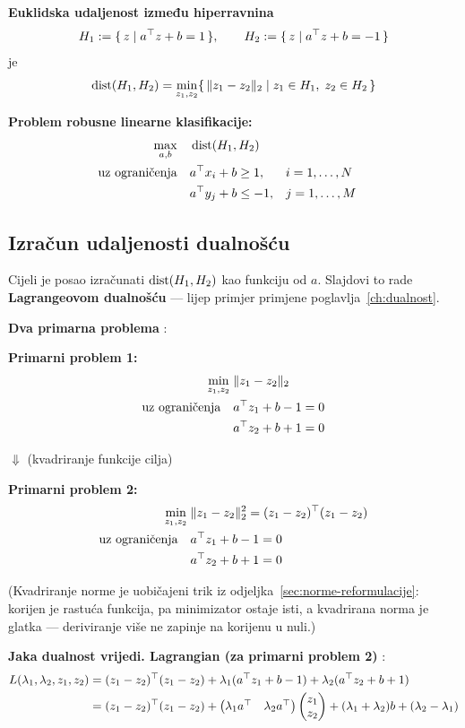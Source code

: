 \textbf{Euklidska udaljenost između hiperravnina}
\[
H_1 := \{\, z \mid a\T z + b = 1 \,\}, \qquad
H_2 := \{\, z \mid a\T z + b = -1 \,\}
\]
je
\[
\dist(H_1, H_2) = \min_{z_1,z_2}\{\, \|z_1 - z_2\|_2 \mid
z_1 \in H_1,\; z_2 \in H_2 \,\}
\]

\textbf{Problem robusne linearne klasifikacije:}
\begin{equation}
\label{eq:robusna-klasifikacija}
\begin{aligned}
\max_{a,b} \quad & \dist(H_1, H_2) \\
\uzogr & a\T x_i + b \ge 1, && i = 1,\dots,N \\
       & a\T y_j + b \le -1, && j = 1,\dots,M
\end{aligned}
\end{equation}

\subsection{Izračun udaljenosti dualnošću}

Cijeli je posao izračunati $\dist(H_1,H_2)$ kao funkciju od $a$. Slajdovi to
rade \textbf{Lagrangeovom dualnošću} --- lijep primjer primjene
poglavlja~\ref{ch:dualnost}.

\textbf{Dva primarna problema} :

\textbf{Primarni problem 1:}
\[
\begin{aligned}
\min_{z_1,z_2} \; & \|z_1 - z_2\|_2 \\
\uzogr & a\T z_1 + b - 1 = 0 \\
& a\T z_2 + b + 1 = 0
\end{aligned}
\]

\centerline{$\Downarrow$ \quad (kvadriranje funkcije cilja)}

\textbf{Primarni problem 2:}
\[
\begin{aligned}
\min_{z_1,z_2} \; & \|z_1 - z_2\|_2^2 = (z_1-z_2)\T(z_1-z_2) \\
\uzogr & a\T z_1 + b - 1 = 0 \\
& a\T z_2 + b + 1 = 0
\end{aligned}
\]

(Kvadriranje norme je uobičajeni trik iz odjeljka~\ref{sec:norme-reformulacije}:
korijen je rastuća funkcija, pa minimizator ostaje isti, a kvadrirana norma je
glatka --- deriviranje više ne zapinje na korijenu u nuli.)

\textbf{Jaka dualnost vrijedi. Lagrangian (za primarni problem 2)}
:
\begin{align}
L(\lambda_1,\lambda_2,z_1,z_2)
&= (z_1-z_2)\T(z_1-z_2) + \lambda_1(a\T z_1 + b - 1)
   + \lambda_2(a\T z_2 + b + 1) \\
&= (z_1-z_2)\T(z_1-z_2)
   + \begin{pmatrix}\lambda_1a\T & \lambda_2a\T\end{pmatrix}
     \begin{pmatrix}z_1\\z_2\end{pmatrix}
   + (\lambda_1+\lambda_2)b + (\lambda_2 - \lambda_1)
\end{align}

